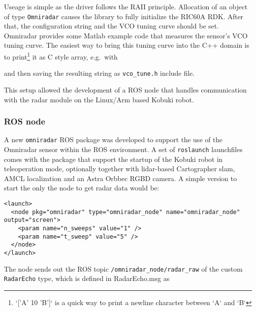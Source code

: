 Useage is simple as the driver follows the RAII principle. Allocation of
an object of type \texttt{Omniradar} causes the library to fully
initialize the RIC60A RDK. After that, the configuration string and the
VCO tuning curve should be set. Omniradar provides some Matlab example
code that measures the sensor's VCO tuning curve. The easiest way to
bring this tuning curve into the C++ domain is to
print\footnote{`['A' 10 'B']` is a quick way to print a newline character between `A` and `B`}
it as C style array, e.g.~with

\begin{Shaded}
\end{Shaded}

and then saving the resulting string as \texttt{vco\_tune.h} include
file.

This setup allowed the development of a ROS node that handles
communication with the radar module on the Linux/Arm based Kobuki robot.

\subsubsection{ROS node}\label{ros-node}

A new \texttt{omniradar} ROS package was developed to support the use of
the Omniradar sensor within the ROS environment. A set of
\texttt{roslaunch} launchfiles comes with the package that support the
startup of the Kobuki robot in teleoperation mode, optionally together
with lidar-based Cartographer slam, AMCL localization and an Astra
Orbbec RGBD camera. A simple version to start the only the node to get
radar data would be:

\begin{verbatim}
<launch>
  <node pkg="omniradar" type="omniradar_node" name="omniradar_node" output="screen">
    <param name="n_sweeps" value="1" />
    <param name="t_sweep" value="5" />
  </node>
</launch>
\end{verbatim}

The node sends out the ROS topic \texttt{/omniradar\_node/radar\_raw} of
the custom \texttt{RadarEcho} type, which is defined in RadarEcho.msg as

